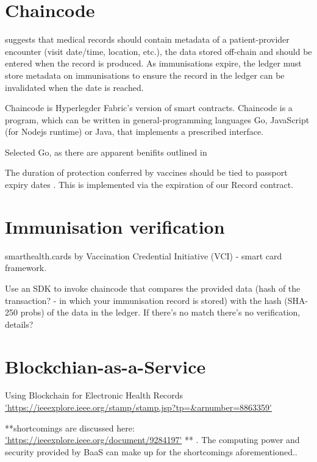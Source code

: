 \section{Chaincode}

\cite{alexaki_blockchain-based_2018} suggests that medical records should contain metadata of a patient-provider encounter (visit date/time, location, etc.), 
the data stored off-chain and should be entered when the record is produced. As immunisations expire, the ledger must store metadata on immunisations to ensure the record in the ledger can be invalidated when the date is reached.

Chaincode is Hyperlegder Fabric's version of smart contracts. Chaincode is a program, which can be written in general-programming languages Go, JavaScript (for Nodejs runtime) or Java, that implements a prescribed interface.

Selected Go, as there are apparent benifits outlined in \cite{foschini_hyperledger_2020}

The duration of protection conferred by vaccines should
be tied to passport expiry dates \cite{dye_covid-19_2021}.
This is implemented via the expiration of our Record contract.

\section{Immunisation verification}
smarthealth.cards by Vaccination Credential Initiative (VCI) - smart card framework.\linebreak[1]

Use an SDK to invoke chaincode that compares the provided data (hash of the transaction? - in which your immunisation record is stored) with the hash (SHA-250 probs) of the data in the ledger. If there's no match there's no verification, details?

\section{Blockchian-as-a-Service}

Using Blockchain for Electronic Health Records \url{'https://ieeexplore.ieee.org/stamp/stamp.jsp?tp=&arnumber=8863359'} \cite{shahnaz_using_2019} 


**shortcomings are discussed here: \url{'https://ieeexplore.ieee.org/document/9284197'} \cite{brotsis_security_2020} ** . The computing power and security provided by BaaS can make up for the shortcomings aforementioned.\cite{song_research_2021}.

